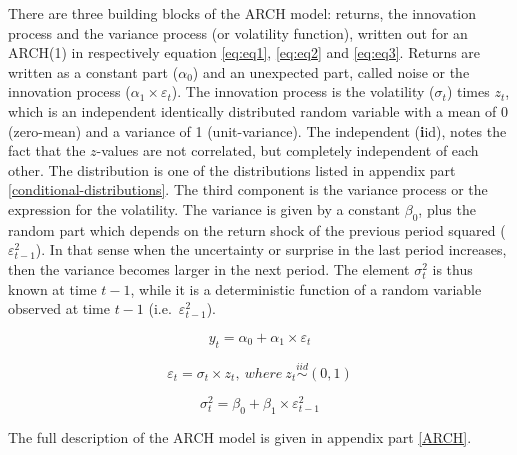 \documentclass[a4paper, nobind]{templates/ociamthesis}
\begin{document}
\noindent There are three building blocks of the ARCH model: returns, the innovation process and the variance process (or volatility function), written out for an ARCH(1) in respectively equation \eqref{eq:eq1}, \eqref{eq:eq2} and \eqref{eq:eq3}. Returns are written as a constant part (\(\alpha_0\)) and an unexpected part, called noise or the innovation process (\(\alpha_1 \times \varepsilon_t\)). The innovation process is the volatility (\(\sigma_t\)) times \(z_t\), which is an independent identically distributed random variable with a mean of 0 (zero-mean) and a variance of 1 (unit-variance). The independent (\textbf{i}id), notes the fact that the \(z\)-values are not correlated, but completely independent of each other. The distribution is one of the distributions listed in appendix part \ref{conditional-distributions}. The third component is the variance process or the expression for the volatility. The variance is given by a constant \(\beta_0\), plus the random part which depends on the return shock of the previous period squared (\(\varepsilon_{t-1}^2\)). In that sense when the uncertainty or surprise in the last period increases, then the variance becomes larger in the next period. The element \(\sigma_t^2\) is thus known at time \(t-1\), while it is a deterministic function of a random variable observed at time \(t-1\) (i.e.~\(\varepsilon_{t-1}^2\)).

\begin{equation} 
y_{t} = \alpha_0 + \alpha_1 \times \varepsilon_t
 \label{eq:eq1} 
\end{equation}
\vspace{-15mm}

\begin{equation}
\varepsilon_{t} = \sigma_t \times z_t, \ where \ z_t \stackrel{iid}{\sim} (0,1)
 \label{eq:eq2} 
\end{equation}
\vspace{-15mm}

\begin{equation}
\sigma_{t}^{2} = \beta_0 + \beta_1 \times  \varepsilon_{t-1}^2 
 \label{eq:eq3}
\end{equation}

\noindent The full description of the ARCH model is given in appendix part \ref{ARCH}.~\\
\end{document}
